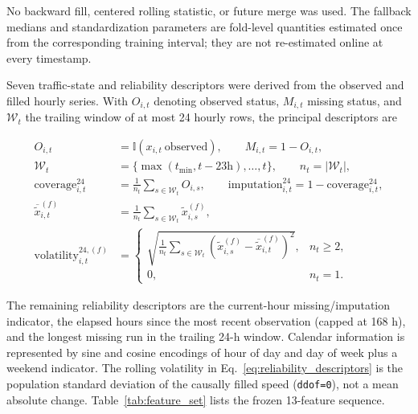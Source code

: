 \documentclass[pdflatex,sn-basic,Numbered]{sn-jnl}
\begin{document}
No backward fill, centered rolling statistic, or future merge was used. The fallback medians and standardization parameters are fold-level quantities estimated once from the corresponding training interval; they are not re-estimated online at every timestamp.

Seven traffic-state and reliability descriptors were derived from the observed and filled hourly series. With $O_{i,t}$ denoting observed status, $M_{i,t}$ missing status, and $\mathcal{W}_{t}$ the trailing window of at most 24 hourly rows, the principal descriptors are

\begin{equation}
\begin{aligned}
O_{i,t}&=\mathbb{I}(x_{i,t}\ \text{observed}),\qquad M_{i,t}=1-O_{i,t},\\
\mathcal{W}_{t}&=\{\max(t_{\min},t-23\mathrm{h}),\ldots,t\},\qquad n_t=|\mathcal{W}_t|,\\
\mathrm{coverage}_{i,t}^{24}&=\frac{1}{n_t}\sum_{s\in\mathcal{W}_t}O_{i,s},\qquad
\mathrm{imputation}_{i,t}^{24}=1-\mathrm{coverage}_{i,t}^{24},\\
\overline{\widetilde{x}}_{i,t}^{(f)}&=\frac{1}{n_t}\sum_{s\in\mathcal{W}_t}\widetilde{x}_{i,s}^{(f)},\\
\mathrm{volatility}_{i,t}^{24,(f)}&=
\begin{cases}
\sqrt{\frac{1}{n_t}\sum_{s\in\mathcal{W}_t}\left(\widetilde{x}_{i,s}^{(f)}-\overline{\widetilde{x}}_{i,t}^{(f)}\right)^2}, & n_t\ge2,\\
0, & n_t=1.
\end{cases}
\end{aligned}
\label{eq:reliability_descriptors}
\end{equation}

The remaining reliability descriptors are the current-hour missing/imputation indicator, the elapsed hours since the most recent observation (capped at 168 h), and the longest missing run in the trailing 24-h window. Calendar information is represented by sine and cosine encodings of hour of day and day of week plus a weekend indicator. The rolling volatility in Eq.~\eqref{eq:reliability_descriptors} is the population standard deviation of the causally filled speed (\texttt{ddof=0}), not a mean absolute change. Table~\ref{tab:feature_set} lists the frozen 13-feature sequence.
\end{document}

